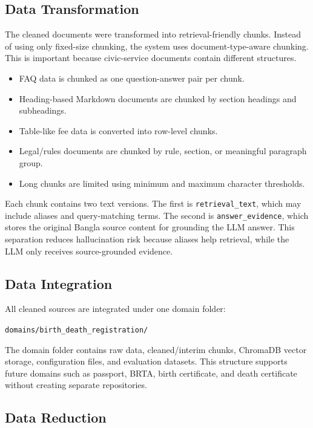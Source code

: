 \subsection{Data Transformation}

The cleaned documents were transformed into retrieval-friendly chunks. Instead of using only fixed-size chunking, the system uses document-type-aware chunking. This is important because civic-service documents contain different structures.

\begin{itemize}
    \item FAQ data is chunked as one question-answer pair per chunk.
    \item Heading-based Markdown documents are chunked by section headings and subheadings.
    \item Table-like fee data is converted into row-level chunks.
    \item Legal/rules documents are chunked by rule, section, or meaningful paragraph group.
    \item Long chunks are limited using minimum and maximum character thresholds.
\end{itemize}

Each chunk contains two text versions. The first is \texttt{retrieval\_text}, which may include aliases and query-matching terms. The second is \texttt{answer\_evidence}, which stores the original Bangla source content for grounding the LLM answer. This separation reduces hallucination risk because aliases help retrieval, while the LLM only receives source-grounded evidence.

\subsection{Data Integration}

All cleaned sources are integrated under one domain folder:

\begin{center}
\texttt{domains/birth\_death\_registration/}
\end{center}

The domain folder contains raw data, cleaned/interim chunks, ChromaDB vector storage, configuration files, and evaluation datasets. This structure supports future domains such as passport, BRTA, birth certificate, and death certificate without creating separate repositories.

\subsection{Data Reduction}

